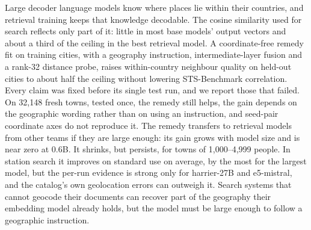 Large decoder language models know where places lie within their countries, and retrieval training keeps that knowledge decodable. The cosine similarity used for search reflects only part of it: little in most base models' output vectors and about a third of the ceiling in the best retrieval model. A coordinate-free remedy fit on training cities, with a geography instruction, intermediate-layer fusion and a rank-32 distance probe, raises within-country neighbour quality on held-out cities to about half the ceiling without lowering STS-Benchmark correlation. Every claim was fixed before its single test run, and we report those that failed. On 32,148 fresh towns, tested once, the remedy still helps, the gain depends on the geographic wording rather than on using an instruction, and seed-pair coordinate axes do not reproduce it. The remedy transfers to retrieval models from other teams if they are large enough: its gain grows with model size and is near zero at 0.6B. It shrinks, but persists, for towns of 1,000--4,999 people. In station search it improves on standard use on average, by the most for the largest model, but the per-run evidence is strong only for harrier-27B and e5-mistral, and the catalog's own geolocation errors can outweigh it. Search systems that cannot geocode their documents can recover part of the geography their embedding model already holds, but the model must be large enough to follow a geographic instruction.
